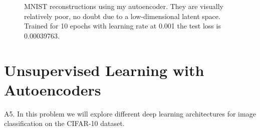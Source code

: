 \documentclass{article}
\newcommand{\1}{\mathbf{1}}
\begin{document}
\begin{enumerate}
\begin{figure}[h!]
        \caption{MNIST reconstructions using my autoencoder. They are visually relatively poor, no doubt due to a low-dimensional latent space. Trained for 10 epochs with learning rate at 0.001 the test loss is 0.00039763.}
    \end{figure}
\end{enumerate}
\newpage
  




\newpage
\section*{Unsupervised Learning with Autoencoders}

A5.  In this problem we will explore different deep learning architectures for image classification on the CIFAR-10 dataset. 
\end{document}
